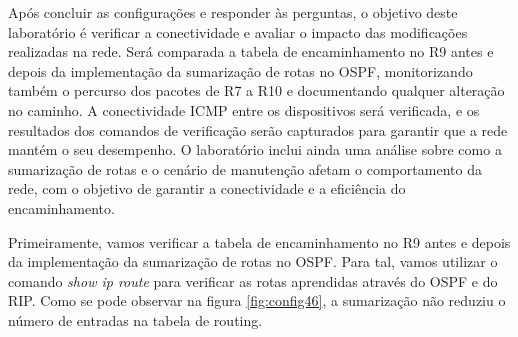 \documentclass[11pt,english, openright, oneside]{book}
\begin{document}
\par Após concluir as configurações e responder às perguntas, o objetivo deste laboratório é verificar a conectividade e avaliar o impacto das modificações realizadas na rede. Será comparada a tabela de encaminhamento no R9 antes e depois da implementação da sumarização de rotas no OSPF, monitorizando também o percurso dos pacotes de R7 a R10 e documentando qualquer alteração no caminho. A conectividade ICMP entre os dispositivos será verificada, e os resultados dos comandos de verificação serão capturados para garantir que a rede mantém o seu desempenho. O laboratório inclui ainda uma análise sobre como a sumarização de rotas e o cenário de manutenção afetam o comportamento da rede, com o objetivo de garantir a conectividade e a eficiência do encaminhamento.
\vspace{0.2cm}

\par Primeiramente, vamos verificar a tabela de encaminhamento no R9 antes e depois da implementação da sumarização de rotas no OSPF. Para tal, vamos utilizar o comando \textit{show ip route} para verificar as rotas aprendidas através do OSPF e do RIP. Como se pode observar na figura \ref{fig:config46}, a sumarização não reduziu o número de entradas na tabela de routing.
\vspace{0.2cm}
\end{document}
